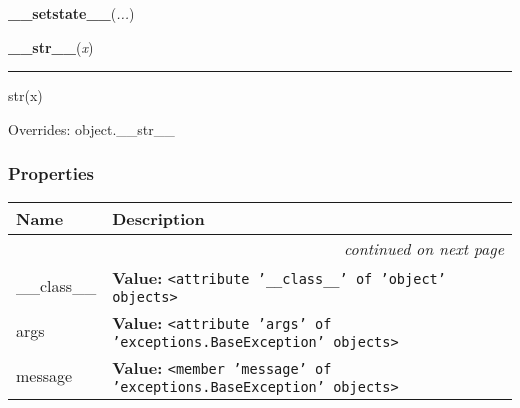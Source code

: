     \label{exceptions:BaseException:__setstate__}

    \vspace{0.5ex}

    \begin{boxedminipage}{\textwidth}

    \raggedright \textbf{\_\_setstate\_\_}(\textit{...})

    \end{boxedminipage}

    \vspace{0.5ex}

    \begin{boxedminipage}{\textwidth}

    \raggedright \textbf{\_\_str\_\_}(\textit{x})

    \vspace{-1.5ex}

    \rule{\textwidth}{0.5\fboxrule}
    str(x)

    \vspace{1ex}

      Overrides: object.\_\_str\_\_

    \end{boxedminipage}



  \subsubsection{Properties}

\begin{longtable}{|p{}|p{}|l}
\cline{1-2}
\cline{1-2} \centering \textbf{Name} & \centering \textbf{Description}& \\
\cline{1-2}
\endhead\cline{1-2}\multicolumn{3}{r}{\small\textit{continued on next page}}\\\endfoot\cline{1-2}
\endlastfoot\raggedright \_\-\_\-c\-l\-a\-s\-s\-\_\-\_\- & \raggedright \textbf{Value:} 
{\tt {\textless}attribute '\_\_class\_\_' of 'object' objects{\textgreater}}&\\
\cline{1-2}
\raggedright a\-r\-g\-s\- & \raggedright \textbf{Value:} 
{\tt {\textless}attribute 'args' of 'exceptions.BaseException' objects{\textgreater}}&\\
\cline{1-2}
\raggedright m\-e\-s\-s\-a\-g\-e\- & \raggedright \textbf{Value:} 
{\tt {\textless}member 'message' of 'exceptions.BaseException' objects{\textgreater}}&\\
\cline{1-2}
\end{longtable}

